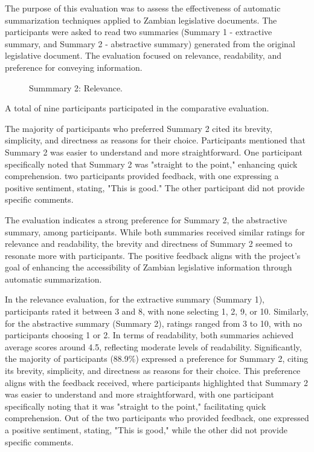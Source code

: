 \documentclass[conference]{IEEEtran}
\begin{document}
The purpose of this evaluation was to assess the effectiveness of automatic summarization techniques applied to Zambian legislative documents. The participants were asked to read two summaries (Summary 1 - extractive summary, and Summary 2 - abstractive summary) generated from the original legislative document. The evaluation focused on relevance, readability, and preference for conveying information.

\begin{figure}%
%
\caption{Summmary 2: Relevance.}
\label{fig:results_and_discussion:summarisation_models:summary2_relevance}
\end{figure}

A total of nine participants participated in the comparative evaluation.

The majority of participants who preferred Summary 2 cited its brevity, simplicity, and directness as reasons for their choice. Participants mentioned that Summary 2 was easier to understand and more straightforward. One participant specifically noted that Summary 2 was "straight to the point," enhancing quick comprehension. two participants provided feedback, with one expressing a positive sentiment, stating, "This is good." The other participant did not provide specific comments.

The evaluation indicates a strong preference for Summary 2, the abstractive summary, among participants. While both summaries received similar ratings for relevance and readability, the brevity and directness of Summary 2 seemed to resonate more with participants. The positive feedback aligns with the project's goal of enhancing the accessibility of Zambian legislative information through automatic summarization.

In the relevance evaluation, for the extractive summary (Summary 1), participants rated it between 3 and 8, with none selecting 1, 2, 9, or 10. Similarly, for the abstractive summary (Summary 2), ratings ranged from 3 to 10, with no
participants choosing 1 or 2. In terms of readability, both summaries achieved average scores
around 4.5, reflecting moderate levels of readability. Significantly, the majority of participants (88.9\%) expressed a preference for Summary 2, citing its brevity, simplicity, and directness as reasons for their choice. This preference aligns with the feedback received, where participants highlighted that Summary 2 was easier to understand and more straightforward, with one participant specifically noting that it was "straight to the point," facilitating quick comprehension. Out of the two participants who provided feedback, one expressed a positive sentiment, stating, "This is good," while the other did not provide specific comments.
\end{document}
